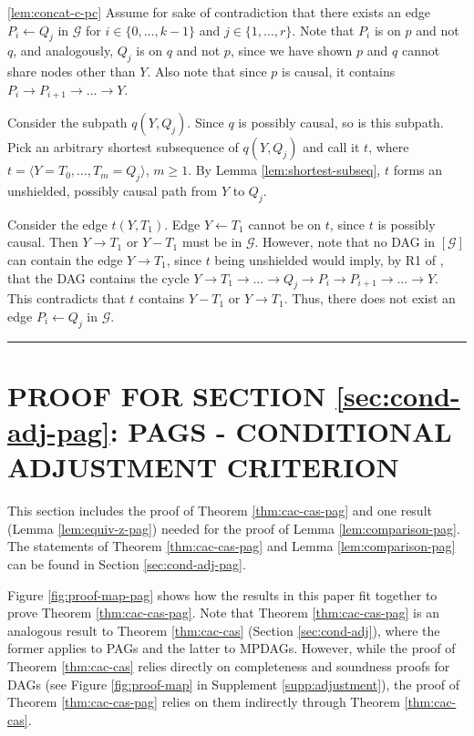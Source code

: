 \documentclass[twoside]{article}
\newcommand{\g}[1][G]{\mathcal{#1}}
\newenvironment{proofof}[1][]{\begin{trivlist}
\item[\hskip \labelsep {\bfseries Proof of #1.}]}{\hfill\BlackBox\end{trivlist}}
\newcommand{\BlackBox}{\rule{1.5ex}{1.5ex}}
\begin{document}
\begin{proofof}[Lemma \ref{lem:concat}]
    \ref{lem:concat-c-pc}
    Assume for sake of contradiction that there exists an edge $P_i \gets Q_j$ in $\g$ for $i \in \{0, \dots, k-1\}$ and $j \in \{1, \dots, r\}$. Note that $P_i$ is on $p$ and not $q$, and analogously, $Q_j$ is on $q$ and not $p$, since we have shown $p$ and $q$ cannot share nodes other than $Y$. Also note that since $p$ is causal, it contains $P_i \to P_{i+1} \to \dots \to Y$.
    
    Consider the subpath $q( Y, Q_j)$. Since $q$ is possibly causal, so is this subpath. Pick an arbitrary shortest subsequence of $q( Y, Q_j)$ and call it $t$, where $t=\langle Y=T_0, \dots, T_m=Q_j \rangle$, $m \ge 1$. By Lemma \ref{lem:shortest-subseq}, $t$ forms an unshielded, possibly causal path from $Y$ to $Q_j$.
    
    Consider the edge $t(Y, T_1)$. Edge $Y \gets T_1$ cannot be on $t$, since $t$ is possibly causal. Then $Y \to T_1$ or $Y - T_1$ must be in $\g$. However, note that no DAG in $[\g]$ can contain the edge $Y \to T_1$, since $t$ being unshielded would imply, by R1 of \cite{meek1995causal}, that the DAG contains the cycle $Y \to T_1 \to \dots \to Q_j \to P_i \to P_{i+1} \to \dots \to Y$. This contradicts that $t$ contains $Y - T_1$ or $Y \to T_1$. Thus, there does not exist an edge $P_i \gets Q_j$ in $\g$.
\end{proofof}








\section{PROOF FOR SECTION \ref{sec:cond-adj-pag}: PAGS - CONDITIONAL ADJUSTMENT CRITERION}
\label{supp:comparison-pag}

This section includes the proof of Theorem \ref{thm:cac-cas-pag} and one result (Lemma \ref{lem:equiv-z-pag}) needed for the proof of Lemma \ref{lem:comparison-pag}. The statements of Theorem \ref{thm:cac-cas-pag} and Lemma \ref{lem:comparison-pag} can be found in Section \ref{sec:cond-adj-pag}.


Figure \ref{fig:proof-map-pag} shows how the results in this paper fit together to prove Theorem \ref{thm:cac-cas-pag}. Note that Theorem \ref{thm:cac-cas-pag} is an analogous result to Theorem \ref{thm:cac-cas} (Section \ref{sec:cond-adj}), where the former applies to PAGs and the latter to MPDAGs. However, while the proof of Theorem \ref{thm:cac-cas} relies directly on completeness and soundness proofs for DAGs (see Figure \ref{fig:proof-map} in Supplement \ref{supp:adjustment}), the proof of Theorem \ref{thm:cac-cas-pag} relies on them indirectly through Theorem \ref{thm:cac-cas}.
\end{document}

